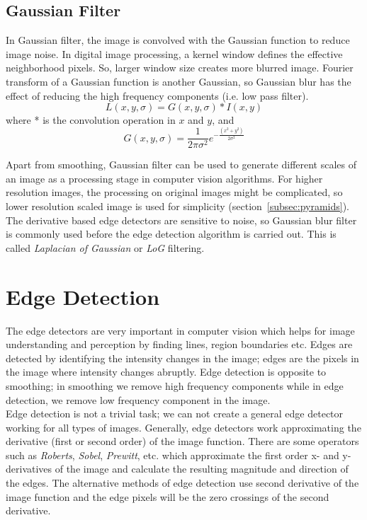 \subsection*{Gaussian Filter}
In Gaussian filter, the image is convolved with the Gaussian function to reduce image noise. In digital image processing, a kernel window defines the effective neighborhood pixels. So, larger window size creates more blurred image. Fourier transform of a Gaussian function is another Gaussian, so Gaussian blur has the effect of reducing the high frequency components (i.e. low pass filter). \\
\begin{equation}
L(x,y,\sigma)=G(x,y,\sigma)* I(x,y)
\label{eq:gaussian_blur}
\end{equation}
where * is the convolution operation in $x$ and $y$, and 
\begin{equation}
G(x,y,\sigma)=\frac{1}{2 \pi \sigma^2} e^{-\frac{(x^2+y^2)}{2 \sigma^2}}
\label{eq:gaussian-function}
\end{equation}

\noindent Apart from smoothing, Gaussian filter can be used to generate different scales of an image as a processing stage in computer vision algorithms. For higher resolution images, the processing on original images might be complicated, so lower resolution scaled image is used for simplicity (section~\ref{subsec:pyramids}).\\

\noindent The derivative based edge detectors are sensitive to noise, so Gaussian blur filter is commonly used before the edge detection algorithm is carried out. This is called \emph{Laplacian of Gaussian} or \emph{LoG} filtering.

\section{Edge Detection}
\label{sec:edge-detection}
The edge detectors are very important in computer vision which helps for image understanding and perception by finding lines, region boundaries etc. Edges are detected by identifying the intensity changes in the image; edges are the pixels in the image where intensity changes abruptly. Edge detection is opposite to smoothing; in smoothing we remove high frequency components while in edge detection, we remove low frequency component in the image. \\

\noindent Edge detection is not a trivial task; we can not create a general edge detector working for all types of images. Generally, edge detectors work approximating the derivative (first or second order) of the image function. There are some operators such as \textit{Roberts}, \textit{Sobel}, \textit{Prewitt}, etc. which approximate the first order x- and y- derivatives of the image and calculate the resulting magnitude and direction of the edges. The alternative methods of edge detection use second derivative of the image function and the edge pixels will be the zero crossings of the second derivative.\\

